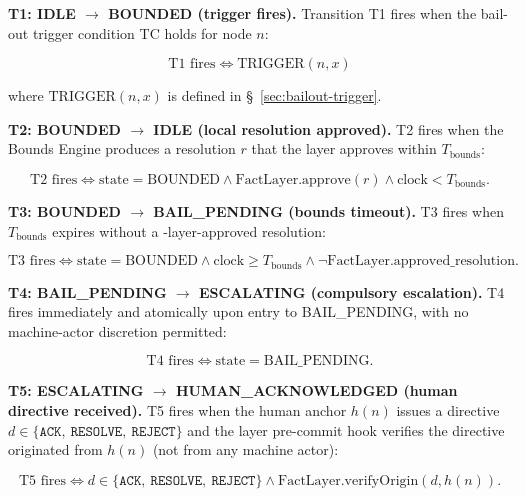 \bigskip
\noindent\textbf{T1: IDLE $\rightarrow$ BOUNDED (trigger fires).} Transition T1 fires when the bail-out trigger condition TC holds for node $n$:

\begin{equation}
\text{T1 fires} \iff \text{TRIGGER}(n, x) \tag{T1}
\end{equation}

where $\text{TRIGGER}(n, x)$ is defined in \S~\ref{sec:bailout-trigger}.

\bigskip
\noindent\textbf{T2: BOUNDED $\rightarrow$ IDLE (local resolution approved).} T2 fires when the Bounds Engine produces a resolution $r$ that the \fact{} layer approves within $T_{\text{bounds}}$:

\begin{equation}
\text{T2 fires} \iff \text{state} = \text{BOUNDED} \land \text{FactLayer.approve}(r) \land \text{clock} < T_{\text{bounds}}. \tag{T2}
\end{equation}

\bigskip
\noindent\textbf{T3: BOUNDED $\rightarrow$ BAIL\_PENDING (bounds timeout).} T3 fires when $T_{\text{bounds}}$ expires without a \fact-layer-approved resolution:

\begin{equation}
\text{T3 fires} \iff \text{state} = \text{BOUNDED} \land \text{clock} \geq T_{\text{bounds}} \land \neg\text{FactLayer.approved\_resolution}. \tag{T3}
\end{equation}

\bigskip
\noindent\textbf{T4: BAIL\_PENDING $\rightarrow$ ESCALATING (compulsory escalation).} T4 fires immediately and atomically upon entry to BAIL\_PENDING, with no machine-actor discretion permitted:

\begin{equation}
\text{T4 fires} \iff \text{state} = \text{BAIL\_PENDING}. \tag{T4}
\end{equation}

\bigskip
\noindent\textbf{T5: ESCALATING $\rightarrow$ HUMAN\_ACKNOWLEDGED (human directive received).} T5 fires when the human anchor $h(n)$ issues a directive $d \in \{\texttt{ACK},\ \texttt{RESOLVE},\ \texttt{REJECT}\}$ and the \fact{} layer pre-commit hook verifies the directive originated from $h(n)$ (not from any machine actor):

\begin{equation}
\text{T5 fires} \iff d \in \{\texttt{ACK},\ \texttt{RESOLVE},\ \texttt{REJECT}\} \land \text{FactLayer.verifyOrigin}(d, h(n)). \tag{T5}
\end{equation}

